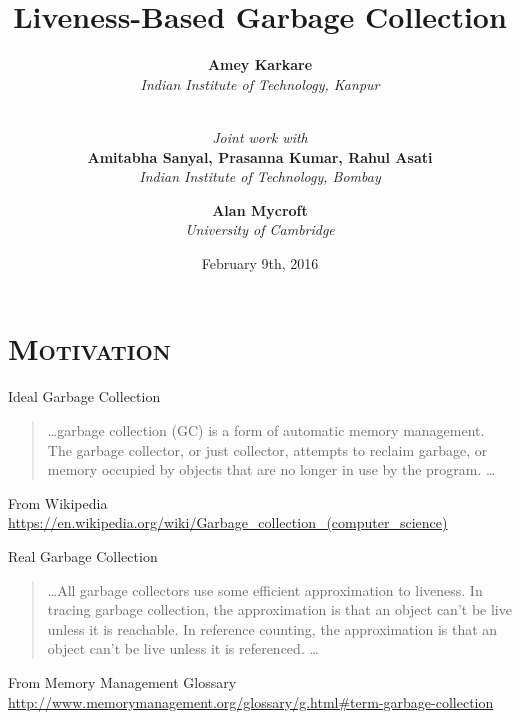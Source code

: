 \documentclass[xcolor=x11names,compress,mathserif]{beamer}
\renewcommand{\(}{\begin{columns}}
\renewcommand{\)}{\end{columns}}
\newcommand{\<}[1]{\begin{column}{#1}}
\renewcommand{\>}{\end{column}}
\begin{document}
\section{\scshape Motivation}
\begin{frame}
\title{Liveness-Based Garbage Collection}
\author{
        {\bf Amey Karkare}\\{\it Indian Institute of Technology, Kanpur}\\ \and
        \\ {\em Joint work with} \\
        {\bf Amitabha Sanyal, Prasanna Kumar, Rahul Asati}\\{\it Indian Institute of
          Technology, Bombay}\\ \and
        {\bf Alan Mycroft}\\{\it University of Cambridge}
}


\date{
	February 9th, 2016
}
\titlepage
\end{frame}


\begin{frame}{Ideal Garbage Collection}
  \begin{quote}
    \ldots garbage collection (GC) is a form of automatic memory management.  The  garbage  collector,  or  just collector,  attempts  to  reclaim
  garbage, or memory occupied by objects  that are {\red no longer in use} by
  the program. \ldots
  \end{quote}
  From Wikipedia\\ {\scriptsize \url{https://en.wikipedia.org/wiki/Garbage_collection_(computer_science)}}
\end{frame}

\begin{frame}{Real Garbage Collection}
  \begin{quote}
    \ldots All garbage collectors use some efficient {\red approximation to
    liveness}. In {tracing} garbage collection, the approximation is that
    an object can't be live unless it is {\red reachable}. In {reference
      counting}, the approximation is that an object can't be live unless
    it is {\red referenced}. 
    \ldots
  \end{quote}
  From Memory Management Glossary\\
  {\scriptsize \url{http://www.memorymanagement.org/glossary/g.html\#term-garbage-collection}}
\end{frame}
\end{document}

